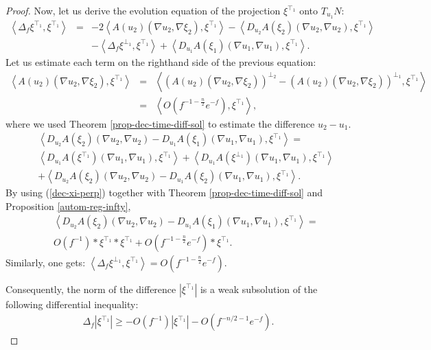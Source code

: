 \documentclass[a4paper,11pt,reqno]{amsart}
\begin{document}
\begin{proof}
Now, let us derive the evolution equation of the projection $\xi^{\top_1}$ onto $T_{u_1}N$:
\begin{eqnarray*}
\left<\Delta_f\xi^{\top_1},\xi^{\top_1}\right>&=&-2\left<A(u_2)(\nabla u_2,\nabla\xi_2),\xi^{\top_1}\right>-\left<D_{u_2}A(\xi_2)(\nabla u_2,\nabla u_2),\xi^{\top_1}\right>\\
&&-\left<\Delta_f\xi^{\perp_1},\xi^{\top_1}\right>+\left<D_{u_1}A(\xi_1)(\nabla u_1,\nabla u_1),\xi^{\top_1}\right>.
\end{eqnarray*}
Let us estimate each term on the righthand side of the previous equation:
\begin{eqnarray*}
\left<A(u_2)(\nabla u_2,\nabla\xi_2),\xi^{\top_1}\right>&=&\left<\left(A(u_2)(\nabla u_2,\nabla\xi_2)\right)^{\perp_2}-\left(A(u_2)(\nabla u_2,\nabla\xi_2)\right)^{\perp_1},\xi^{\top_1}\right>\\
&=&\left<\textit{O}\left(f^{-1-\frac{n}{2}}e^{-f}\right),\xi^{\top_1}\right>,
\end{eqnarray*}
where we used Theorem \ref{prop-dec-time-diff-sol} to estimate the difference $u_2-u_1$.
\begin{eqnarray*}
&&\left<D_{u_2}A(\xi_2)(\nabla u_2,\nabla u_2)-D_{u_1}A(\xi_1)(\nabla u_1,\nabla u_1),\xi^{\top_1}\right>=\\
&&\left<D_{u_1}A(\xi^{\top_1})(\nabla u_1,\nabla u_1),\xi^{\top_1}\right>+\left<D_{u_1}A(\xi^{\perp_1})(\nabla u_1,\nabla u_1),\xi^{\top_1}\right>\\
&&+\left<D_{u_2}A(\xi_2)(\nabla u_2,\nabla u_2)-D_{u_1}A(\xi_2)(\nabla u_1,\nabla u_1),\xi^{\top_1}\right>.
\end{eqnarray*}
By using (\ref{dec-xi-perp}) together with Theorem \ref{prop-dec-time-diff-sol} and Proposition \ref{autom-reg-infty},
\begin{eqnarray*}
&&\left<D_{u_2}A(\xi_2)(\nabla u_2,\nabla u_2)-D_{u_1}A(\xi_1)(\nabla u_1,\nabla u_1),\xi^{\top_1}\right>=\\
&&\textit{O}(f^{-1})\ast \xi^{\top_1}\ast \xi^{\top_1}+\textit{O}(f^{-1-\frac{n}{2}}e^{-f})\ast\xi^{\top_1}.
\end{eqnarray*}
Similarly, one gets: $\left<\Delta_f\xi^{\perp_1},\xi^{\top_1}\right>=\textit{O}(f^{-1-\frac{n}{2}}e^{-f})$.

 Consequently, the norm of the difference $|\xi^{\top_1}|$ is a weak subsolution of the following differential inequality:
\begin{eqnarray*}
\Delta_f|\xi^{\top_1}|\geq -\textit{O}(f^{-1})|\xi^{\top_1}|-\textit{O}(f^{-n/2-1}e^{-f}).
\end{eqnarray*}


\end{proof}
\end{document}

